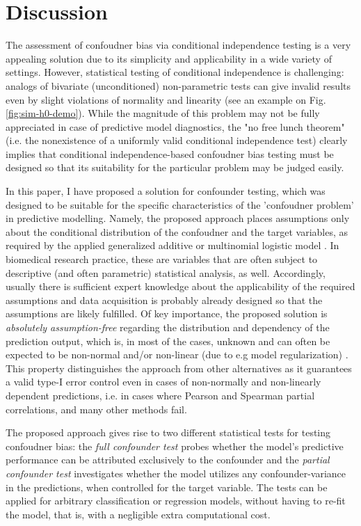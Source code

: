 \documentclass{article}
\begin{document}
\section{Discussion}

The assessment of confoudner bias via conditional independence testing is a very appealing solution due to its simplicity and applicability in a wide variety of settings. However, statistical testing of conditional independence is challenging: analogs of bivariate (unconditioned) non-parametric tests can give invalid results even by slight violations of normality and linearity \citep{korn1984ranges} (see an example on Fig. \ref{fig:sim-h0-demo}). While the magnitude of this problem may not be fully appreciated in case of predictive model diagnostics, the "no free lunch theorem" (i.e. the nonexistence of a uniformly valid conditional independence test) \cite{shah2020hardness} clearly implies that conditional independence-based confoudner bias testing must be designed so that its suitability for the particular problem may be judged easily.

In this paper, I have proposed a solution for confounder testing, which was designed to be suitable for the specific characteristics of the 'confoudner problem' in predictive modelling. Namely, the proposed approach places assumptions only about the conditional distribution of the confoudner and the target variables, as required by the applied generalized additive \cite{hastie1987generalized} or multinomial logistic model \cite{bennett1966multiple, jones1975proability}. In biomedical research practice, these are variables that are often subject to descriptive (and often parametric) statistical analysis, as well. Accordingly, usually there is sufficient expert knowledge about the applicability of the required assumptions and data acquisition is probably already designed so that the assumptions are likely fulfilled.
Of key importance, the proposed solution is \emph{absolutely assumption-free} regarding the distribution and dependency of the prediction output, which is, in most of the cases, unknown and can often be expected to be non-normal and/or non-linear (due to e.g model regularization) \citep{garcia2009study, kristensen2017whole}. 
This property distinguishes the approach from other alternatives as it guarantees a valid type-I error control even in cases of non-normally and non-linearly dependent predictions, i.e. in cases where Pearson and Spearman partial correlations, and many other methods fail.

The proposed approach gives rise to two different statistical tests for testing confoudner bias: the \emph{full confounder test} probes whether the model's predictive performance can be attributed exclusively to the confounder and the \emph{partial confounder test} investigates whether the model utilizes any confounder-variance in the predictions, when controlled for the target variable. 
The tests can be applied for arbitrary classification or regression models, without having to re-fit the model, that is, with a negligible extra computational cost.
\end{document}
